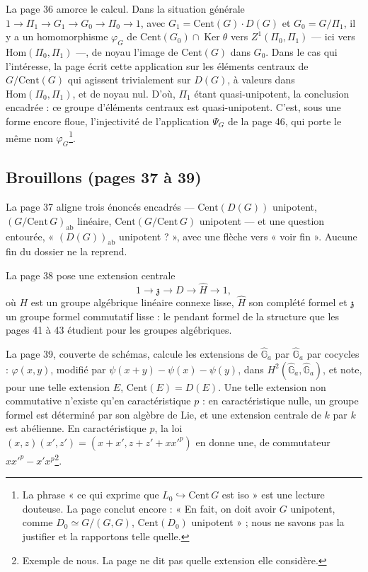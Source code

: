 \documentclass[11pt,a4paper]{article}
\begin{document}
La page 36 amorce le calcul. Dans la situation générale
$1 \to \Pi_1 \to G_1 \to G_0 \to \Pi_0 \to 1$, avec $G_1 = \mathrm{Cent}(G)
\cdot D(G)$ et $G_0 = G/\Pi_1$, il y a un homomorphisme $\varphi_G$ de
$\mathrm{Cent}(G_0) \cap \operatorname{Ker}\theta$ vers
$Z^{1}(\Pi_0, \Pi_1)$ — ici vers $\mathrm{Hom}(\Pi_0, \Pi_1)$ —, de noyau
l'image de $\mathrm{Cent}(G)$ dans $G_0$. Dans le cas qui l'intéresse, la
page écrit cette application sur les éléments centraux de
$G/\mathrm{Cent}(G)$ qui agissent trivialement sur $D(G)$, à valeurs dans
$\mathrm{Hom}(\Pi_0, \Pi_1)$, et de noyau nul. D'où, $\Pi_1$ étant
quasi-unipotent, la conclusion encadrée : ce groupe d'éléments centraux est
quasi-unipotent. C'est, sous une forme encore floue, l'injectivité de
l'application $\Psi_G$ de la page 46, qui porte le même nom
$\varphi_G$\footnote{La phrase « ce qui exprime que $L_0 \hookrightarrow
\mathrm{Cent}\,G$ est iso » est une lecture douteuse. La page conclut
encore : « En fait, on doit avoir $G$ unipotent, comme $D_0 \simeq G/(G,G)$,
$\mathrm{Cent}(D_0)$ unipotent » ; nous ne savons pas la justifier et la
rapportons telle quelle.}.

\subsection*{Brouillons (pages 37 à 39)}

La page 37 aligne trois énoncés encadrés — $\mathrm{Cent}(D(G))$ unipotent,
$(G/\mathrm{Cent}\,G)_{\mathrm{ab}}$ linéaire, $\mathrm{Cent}(G/\mathrm{Cent}
\,G)$ unipotent — et une question entourée, « $(D(G))_{\mathrm{ab}}$
unipotent ? », avec une flèche vers « voir fin ». Aucune fin du dossier ne la
reprend.

La page 38 pose une extension centrale
\[
1 \to \mathfrak{z} \to D \to \widehat{H} \to 1,
\]
où $H$ est un groupe algébrique linéaire connexe lisse, $\widehat{H}$ son
complété formel et $\mathfrak{z}$ un groupe formel commutatif lisse : le
pendant formel de la structure que les pages 41 à 43 étudient pour les
groupes algébriques.

La page 39, couverte de schémas, calcule les extensions de
$\widehat{\mathbb{G}}_a$ par $\widehat{\mathbb{G}}_a$ par cocycles :
$\varphi(x, y)$, modifié par $\psi(x + y) - \psi(x) - \psi(y)$, dans
$H^{2}(\widehat{\mathbb{G}}_a, \widehat{\mathbb{G}}_a)$, et note, pour une
telle extension $E$, $\mathrm{Cent}(E) = D(E)$. Une telle extension non
commutative n'existe qu'en caractéristique $p$ : en caractéristique nulle,
un groupe formel est déterminé par son algèbre de Lie, et une extension
centrale de $k$ par $k$ est abélienne. En caractéristique $p$, la loi
$(x, z)(x', z') = (x + x', z + z' + x x'^{p})$ en donne une, de commutateur
$x x'^{p} - x' x^{p}$\footnote{Exemple de nous. La page ne dit pas quelle
extension elle considère.}.
\end{document}
